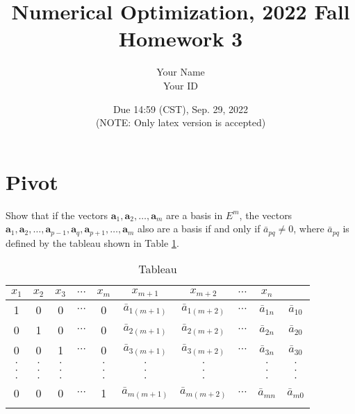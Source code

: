 \documentclass[10pt]{article}
\begin{document}
\title{Numerical Optimization, 2022 Fall\\Homework 3}
\author{Your Name\\Your ID}
\date{Due 14:59 (CST), Sep. 29, 2022 \\(NOTE: Only latex version is accepted)\\}
\maketitle



\section{Pivot}
Show that if the vectors $\bm{a}_1, \bm{a}_2, \dots, \bm{a}_m$ are a basis in $E^m$, the vectors $\bm{a}_1, \bm{a}_2, \dots, \bm{a}_{p-1}, \bm{a}_q, \bm{a}_{p+1}, \dots, \bm{a}_m$ also are a basis if and only if $\bar{a}_{pq} \neq 0$, where $\bar{a}_{pq}$ is defined by the tableau shown in Table \ref{tab: tableau}.
\begin{longtable}[c]{cccccccccc}
	$x_1$   & $x_2$   & $x_3$   & $\cdots$ & $x_m$   & $x_{m+1}$          & $x_{m+2}$          & $\cdots$ & $x_n$          &                \\
	\endfirsthead
	\endhead
	1       & 0       & 0       & $\cdots$ & 0       & $\bar{a}_{1(m+1)}$ & $\bar{a}_{1(m+2)}$ & $\cdots$ & $\bar{a}_{1n}$ & $\bar{a}_{10}$ \\
	0       & 1       & 0       & $\cdots$ & 0       & $\bar{a}_{2(m+1)}$ & $\bar{a}_{2(m+2)}$ & $\cdots$ & $\bar{a}_{2n}$ & $\bar{a}_{20}$ \\
	0       & 0       & 1       & $\cdots$ & 0       & $\bar{a}_{3(m+1)}$ & $\bar{a}_{3(m+2)}$ & $\cdots$ & $\bar{a}_{3n}$ & $\bar{a}_{30}$ \\
	$\cdot$ & $\cdot$ & $\cdot$ &          & $\cdot$ & $\cdot$            & $\cdot$            &          & $\cdot$        & $\cdot$        \\
	$\cdot$ & $\cdot$ & $\cdot$ &          & $\cdot$ & $\cdot$            & $\cdot$            &          & $\cdot$        & $\cdot$        \\
	$\cdot$ & $\cdot$ & $\cdot$ &          & $\cdot$ & $\cdot$            & $\cdot$            &          & $\cdot$        & $\cdot$        \\
	0       & 0       & 0       & $\cdots$ & 1       & $\bar{a}_{m(m+1)}$ & $\bar{a}_{m(m+2)}$ & $\cdots$ & $\bar{a}_{mn}$ & $\bar{a}_{m0}$ \\
	\caption{Tableau}
	\label{tab: tableau}\\
\end{longtable}
\end{document}
